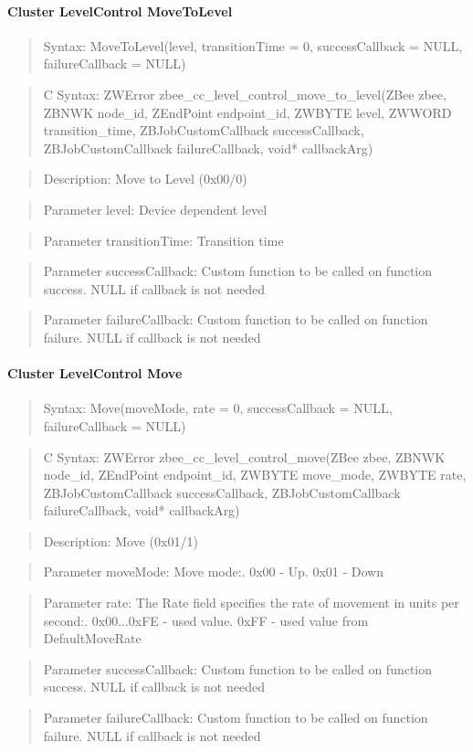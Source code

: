 \paragraph{Cluster LevelControl MoveToLevel}
\begin{quote}Syntax: MoveToLevel(level, transitionTime = 0, successCallback = NULL, failureCallback = NULL)\end{quote}
\begin{quote}C Syntax: ZWError zbee\_cc\_level\_control\_move\_to\_level(ZBee zbee, ZBNWK node\_id, ZEndPoint endpoint\_id, ZWBYTE level, ZWWORD transition\_time, ZBJobCustomCallback successCallback, ZBJobCustomCallback failureCallback, void* callbackArg)\end{quote}
\begin{quote}Description: Move to Level (0x00/0)\end{quote}
\begin{quote}Parameter level: Device dependent level\end{quote}
\begin{quote}Parameter transitionTime: Transition time\end{quote}
\begin{quote}Parameter successCallback: Custom function to be called on function success. NULL if callback is not needed\end{quote}
\begin{quote}Parameter failureCallback: Custom function to be called on function failure. NULL if callback is not needed\end{quote}


\paragraph{Cluster LevelControl Move}
\begin{quote}Syntax: Move(moveMode, rate = 0, successCallback = NULL, failureCallback = NULL)\end{quote}
\begin{quote}C Syntax: ZWError zbee\_cc\_level\_control\_move(ZBee zbee, ZBNWK node\_id, ZEndPoint endpoint\_id, ZWBYTE move\_mode, ZWBYTE rate, ZBJobCustomCallback successCallback, ZBJobCustomCallback failureCallback, void* callbackArg)\end{quote}
\begin{quote}Description: Move (0x01/1)\end{quote}
\begin{quote}Parameter moveMode: Move mode:. 0x00 - Up. 0x01 - Down\end{quote}
\begin{quote}Parameter rate: The Rate field specifies the rate of movement in units per second:. 0x00...0xFE - used value. 0xFF        - used value from DefaultMoveRate\end{quote}
\begin{quote}Parameter successCallback: Custom function to be called on function success. NULL if callback is not needed\end{quote}
\begin{quote}Parameter failureCallback: Custom function to be called on function failure. NULL if callback is not needed\end{quote}


